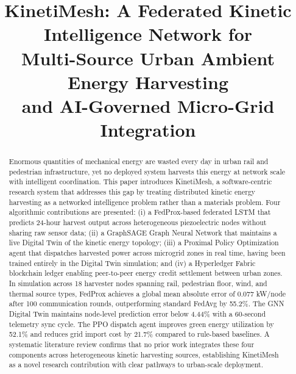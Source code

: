 \documentclass[conference]{IEEEtran}
\begin{document}
\title{KinetiMesh: A Federated Kinetic Intelligence Network for\\
Multi-Source Urban Ambient Energy Harvesting\\
and AI-Governed Micro-Grid Integration}

\author{
\and
{}
}

\maketitle

\begin{abstract}
Enormous quantities of mechanical energy are wasted every day in urban rail and pedestrian infrastructure, yet no deployed system harvests this energy at network scale with intelligent coordination. This paper introduces KinetiMesh, a software-centric research system that addresses this gap by treating distributed kinetic energy harvesting as a networked intelligence problem rather than a materials problem. Four algorithmic contributions are presented: (i) a FedProx-based federated LSTM that predicts 24-hour harvest output across heterogeneous piezoelectric nodes without sharing raw sensor data; (ii) a GraphSAGE Graph Neural Network that maintains a live Digital Twin of the kinetic energy topology; (iii) a Proximal Policy Optimization agent that dispatches harvested power across microgrid zones in real time, having been trained entirely in the Digital Twin simulation; and (iv) a Hyperledger Fabric blockchain ledger enabling peer-to-peer energy credit settlement between urban zones. In simulation across 18 harvester nodes spanning rail, pedestrian floor, wind, and thermal source types, FedProx achieves a global mean absolute error of 0.077 kW/node after 100 communication rounds, outperforming standard FedAvg by 55.2\%. The GNN Digital Twin maintains node-level prediction error below 4.44\% with a 60-second telemetry sync cycle. The PPO dispatch agent improves green energy utilization by 52.1\% and reduces grid import cost by 21.7\% compared to rule-based baselines. A systematic literature review confirms that no prior work integrates these four components across heterogeneous kinetic harvesting sources, establishing KinetiMesh as a novel research contribution with clear pathways to urban-scale deployment.
\end{abstract}
\end{document}
